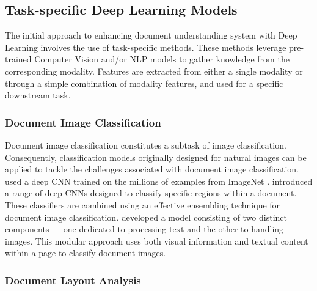 
\subsection{Task-specific Deep Learning Models}

The initial approach to enhancing document understanding system with Deep Learning involves the use of task-specific methods. These methods leverage pre-trained Computer Vision and/or \ac{NLP} models to gather knowledge from the corresponding modality. Features are extracted from either a single modality or through a simple combination of modality features, and used for a specific downstream task. 

\subsubsection{Document Image Classification} 

Document image classification constitutes a subtask of image classification. Consequently, classification models originally designed for natural images can be applied to tackle the challenges associated with document image classification. \citet{afzal2015deepdocclassifier} used a deep \ac{CNN} trained on the millions of examples from ImageNet \citep{deng2009imagenet}. \citet{das2018document} introduced a range of deep \acp{CNN} designed to classify specific regions within a document. These classifiers are combined using an effective ensembling technique for document image classification. \citet{dauphinee2019modular}  developed a model consisting of two distinct components — one dedicated to processing text and the other to handling images. This modular approach uses both visual information and textual content within a page to classify document images.

\subsubsection{Document Layout Analysis} 

